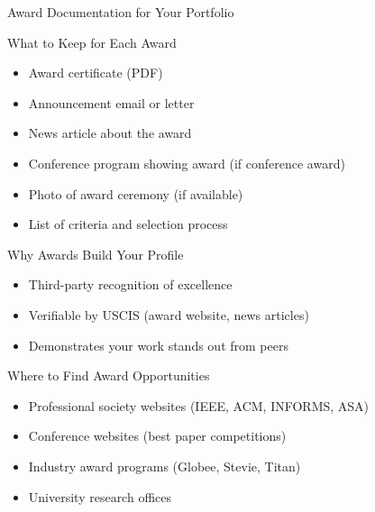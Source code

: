 \documentclass[11pt]{beamer}
\begin{document}
				\begin{frame}{Award Documentation for Your Portfolio}
					\scriptsize
					\begin{block}{What to Keep for Each Award}
						\begin{itemize}
							\item Award certificate (PDF)
							\item Announcement email or letter
							\item News article about the award
							\item Conference program showing award (if conference award)
							\item Photo of award ceremony (if available)
							\item List of criteria and selection process
						\end{itemize}
					\end{block}
					\begin{block}{Why Awards Build Your Profile}
						\begin{itemize}
							\item Third-party recognition of excellence
							\item Verifiable by USCIS (award website, news articles)
							\item Demonstrates your work stands out from peers
						\end{itemize}
					\end{block}
					\begin{block}{Where to Find Award Opportunities}
						\begin{itemize}
							\item Professional society websites (IEEE, ACM, INFORMS, ASA)
							\item Conference websites (best paper competitions)
							\item Industry award programs (Globee, Stevie, Titan)
							\item University research offices
						\end{itemize}
					\end{block}
				\end{frame}
				
\end{document}
